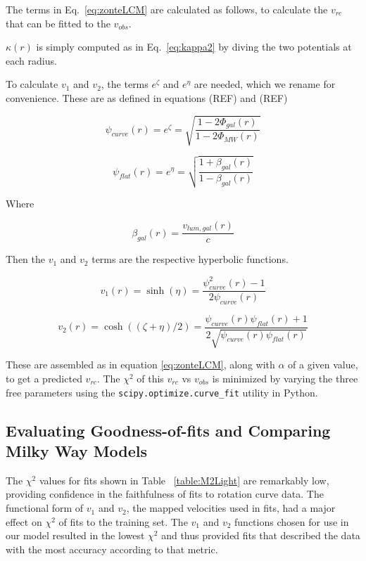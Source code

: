 \documentclass[reprint,%
 amsmath,amssymb,
 aps,
]{revtex4-1}
\begin{document}
The terms in Eq.~\ref{eq:zonteLCM} are calculated as follows, to calculate the  $v_{rc}$ that can be fitted to the   $v_{obs}$. 

$\kappa(r)$ is simply computed as in Eq.~\ref{eq:kappa2} by diving the two potentials at each radius.

To calculate $v_1$ and $v_2$,   the terms $e^\zeta$ and $e^\eta$ are needed, which we rename for convenience. These are as defined in equations (REF) and (REF)

\begin{equation}
    \psi_{curve}(r) = e^\zeta = \sqrt{\frac{1 - 2\Phi_{gal}(r)}{1 - 2\Phi_{MW}(r)}}
\end{equation}

\begin{equation}
    \psi_{flat}(r) = e^\eta = \sqrt{\frac{1 + \beta_{gal}(r)}{1 - \beta_{gal}(r)}}
\end{equation}

Where

\begin{equation}
    \beta_{gal}(r) = \frac{v_{lum,gal}(r)}{c}
\end{equation}

Then the $v_1$ and $v_2$ terms are the respective hyperbolic functions.

\begin{equation}
    v_1(r) = \sinh(\eta) = \frac{\psi_{curve}^2(r) - 1}{2 \psi_{curve}(r)}
\end{equation}

\begin{equation}
    v_2(r) = \cosh((\zeta + \eta)/2) = \frac{\psi_{curve}(r) \psi_{flat}(r) + 1}{
    2\sqrt{\psi_{curve}(r) \psi_{flat}(r)}}
\end{equation}

These are assembled as in equation \ref{eq:zonteLCM}, along with $\alpha$ of a given value, to get a predicted $v_{rc}$. The $\chi^2$ of this $v_{rc}$ vs $v_{obs}$ is minimized by varying the three free parameters using the {\tt scipy.optimize.curve\_fit} utility in Python.

\subsection{Evaluating Goodness-of-fits and Comparing Milky Way Models}

The $\chi^{2}$ values for fits shown in Table ~\ref{table:M2Light} are remarkably low, providing confidence in the faithfulness of fits to rotation curve data. The functional form of ${v_1}$ and ${v_2}$, the mapped velocities used in fits, had a major effect on $\chi^{2}$ of fits to the training set. The ${v_1}$ and ${v_2}$ functions chosen for use in our model resulted in the lowest $\chi^{2}$ and thus provided fits that described the data with the most accuracy according to that metric.
\end{document}
